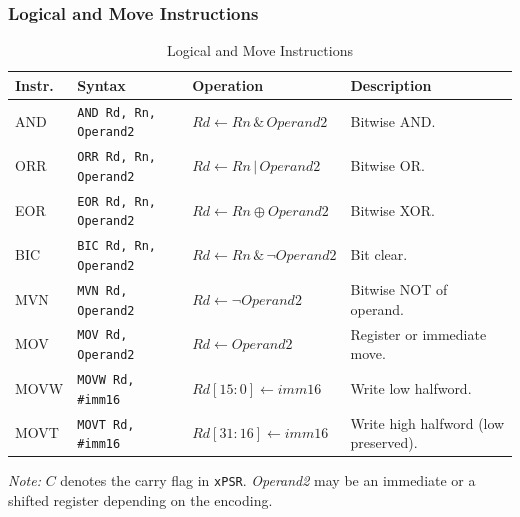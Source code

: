 \subsubsection*{Logical and Move Instructions}
\begin{table}[H]
\centering
\caption{Logical and Move Instructions}
\small
\begin{tabularx}{\linewidth}{@{}l l l X@{}}
\toprule
\textbf{Instr.} & \textbf{Syntax} & \textbf{Operation} & \textbf{Description} \\
\midrule
AND  & \texttt{AND Rd, Rn, Operand2} & $Rd \leftarrow Rn \,\&\, Operand2$ & Bitwise AND. \\
ORR  & \texttt{ORR Rd, Rn, Operand2} & $Rd \leftarrow Rn \,|\, Operand2$ & Bitwise OR. \\
EOR  & \texttt{EOR Rd, Rn, Operand2} & $Rd \leftarrow Rn \oplus Operand2$ & Bitwise XOR. \\
BIC  & \texttt{BIC Rd, Rn, Operand2} & $Rd \leftarrow Rn \,\&\, \neg Operand2$ & Bit clear. \\
MVN  & \texttt{MVN Rd, Operand2}     & $Rd \leftarrow \neg Operand2$ & Bitwise NOT of operand. \\
MOV  & \texttt{MOV Rd, Operand2}     & $Rd \leftarrow Operand2$ & Register or immediate move. \\
MOVW & \texttt{MOVW Rd, \#imm16}     & $Rd[15{:}0] \leftarrow imm16$ & Write low halfword. \\
MOVT & \texttt{MOVT Rd, \#imm16}     & $Rd[31{:}16] \leftarrow imm16$ & Write high halfword (low preserved). \\
\bottomrule
\end{tabularx}

\vspace{2pt}
\footnotesize\emph{Note:} $C$ denotes the carry flag in \texttt{xPSR}. \emph{Operand2} may be an immediate or a shifted register depending on the encoding.
\end{table}
